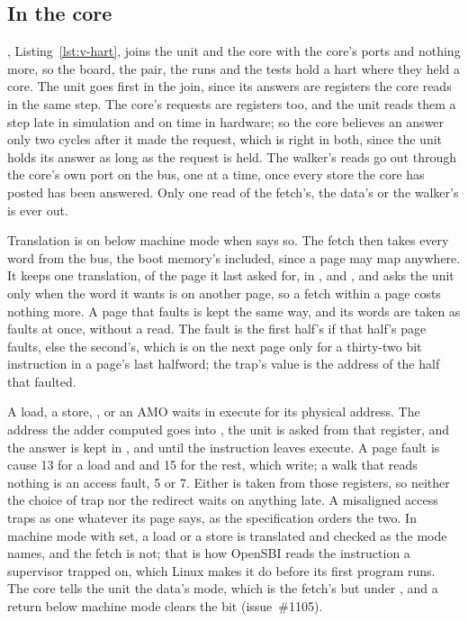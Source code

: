 \documentclass[journal,onecolumn,9pt]{IEEEtran}
\begin{document}




\subsection{In the core}
\label{sec:v-hart}

, Listing~\ref{lst:v-hart}, joins the unit and the core
with the core's ports and nothing more, so the board, the pair, the
runs and the tests hold a hart where they held a core. The unit goes
first in the join, since its answers are registers the core reads in
the same step. The core's requests are registers too, and the unit
reads them a step late in simulation and on time in hardware; so the
core believes an answer only two cycles after it made the request,
which is right in both, since the unit holds its answer as long as the
request is held. The walker's reads go out through the core's own port
on the bus, one at a time, once every store the core has posted has
been answered. Only one read of the fetch's, the data's or the
walker's is ever out.

Translation is on below machine mode when  says so. The
fetch then takes every word from the bus, the boot memory's included,
since a page may map anywhere. It keeps one translation, of the page it
last asked for, in ,  and ,
and asks the unit only when the word it wants is on another page, so a
fetch within a page costs nothing more. A page that faults is kept the
same way, and its words are taken as faults at once, without a read.
The fault is the first half's if that half's page faults, else the
second's, which is on the next page only for a thirty-two bit
instruction in a page's last halfword; the trap's value is the address
of the half that faulted.

A load, a store, ,  or an AMO waits in execute
for its physical address. The address the adder computed goes into
, the unit is asked from that register, and the answer is
kept in ,  and  until the
instruction leaves execute. A page fault is cause 13 for a load and
 and 15 for the rest, which write; a walk that reads nothing
is an access fault, 5 or 7. Either is taken from those registers, so
neither the choice of trap nor the redirect waits on anything late. A
misaligned access traps as one whatever its page says, as the
specification orders the two. In machine mode with  set, a
load or a store is translated and checked as the mode  names,
and the fetch is not; that is how OpenSBI reads the instruction a
supervisor trapped on, which Linux makes it do before its first
program runs. The core tells the unit the data's mode, which is the
fetch's but under , and a return below machine mode clears
the bit (issue~\#1105).
\end{document}
